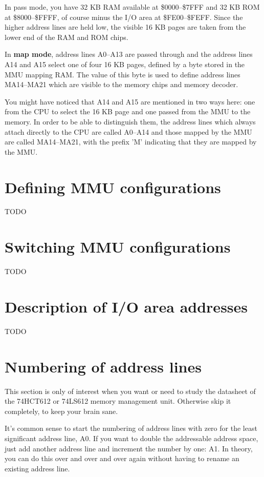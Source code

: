 In pass mode, you have 32 KB RAM available at \$0000--\$7FFF and
32 KB ROM at \$8000--\$FFFF, of course minus the I/O area at
\$FE00--\$FEFF. Since the higher address lines are held low, the
visible 16 KB pages are taken from the lower end of the RAM and
ROM chips.

In {\bf map mode}, address lines A0--A13 are passed through and
the address lines A14 and A15 select one of four 16 KB pages,
defined by a byte stored in the MMU mapping RAM. The value of
this byte is used to define address lines MA14--MA21 which are
visible to the memory chips and memory decoder.

You might have noticed that A14 and A15 are mentioned in two
ways here: one from the CPU to select the 16 KB page and one
passed from the MMU to the memory. In order to be able to
distinguish them, the address lines which always attach directly
to the CPU are called A0--A14 and those mapped by the MMU are
called MA14--MA21, with the prefix 'M' indicating that they are
mapped by the MMU.

\section{Defining MMU configurations}
TODO

\section{Switching MMU configurations}
TODO

\section{Description of I/O area addresses}
TODO

\section{Numbering of address lines}
This section is only of interest when you want or need to study
the datasheet of the 74HCT612 or 74LS612 memory management unit.
Otherwise skip it completely, to keep your brain sane.

It's common sense to start the numbering of address lines with
zero for the least significant address line, A0. If you want to
double the addressable address space, just add another address
line and increment the number by one: A1. In theory, you can do
this over and over and over again without having to rename an
existing address line.

